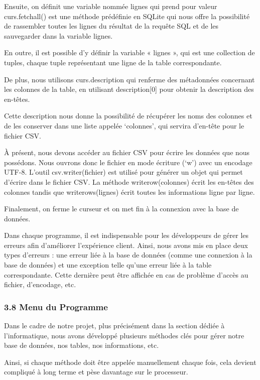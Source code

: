 \documentclass[
]{article}
\begin{document}
Ensuite, on définit une variable nommée lignes qui prend pour valeur
curs.fetchall() est une méthode prédéfinie en SQLite qui nous offre la
possibilité de rassembler toutes les lignes du résultat de la requête
SQL et de les sauvegarder dans la variable lignes.

En outre, il est possible d'y définir la variable « lignes », qui est
une collection de tuples, chaque tuple représentant une ligne de la
table correspondante.

De plus, nous utilisons curs.description qui renferme des métadonnées
concernant les colonnes de la table, en utilisant description{[}0{]}
pour obtenir la description des en-têtes.

Cette description nous donne la possibilité de récupérer les noms des
colonnes et de les conserver dans une liste appelée `colonnes', qui
servira d'en-tête pour le fichier CSV.

À présent, nous devons accéder au fichier CSV pour écrire les données
que nous possédons. Nous ouvrons donc le fichier en mode écriture (`w')
avec un encodage UTF-8. L'outil csv.writer(fichier) est utilisé pour
générer un objet qui permet d'écrire dans le fichier CSV. La méthode
writerow(colonnes) écrit les en-têtes des colonnes tandis que
writerows(lignes) écrit toutes les informations ligne par ligne.

Finalement, on ferme le curseur et on met fin à la connexion avec la
base de données.

Dans chaque programme, il est indispensable pour les développeurs de
gérer les erreurs afin d'améliorer l'expérience client. Ainsi, nous
avons mis en place deux types d'erreurs : une erreur liée à la base de
données (comme une connexion à la base de données) et une exception
telle qu'une erreur liée à la table correspondante. Cette dernière peut
être affichée en cas de problème d'accès au fichier, d'encodage, etc.

\subsubsection{3.8 Menu du Programme}\label{menu-du-programme}

Dans le cadre de notre projet, plus précisément dans la section dédiée à
l'informatique, nous avons développé plusieurs méthodes clés pour gérer
notre base de données, nos tables, nos informations, etc.

Ainsi, si chaque méthode doit être appelée manuellement chaque fois,
cela devient compliqué à long terme et pèse davantage sur le processeur.
\end{document}

